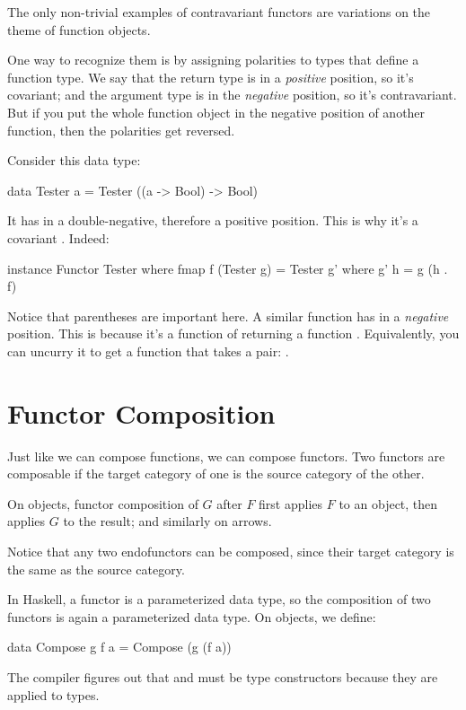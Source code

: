 \documentclass[DaoFP]{subfiles}
\begin{document}
The only non-trivial examples of contravariant functors are variations on the theme of function objects. 

One way to recognize them is by assigning polarities to types that define a function type. We say that the return type is in a \emph{positive} position, so it's covariant; and the argument type is in the \emph{negative} position, so it's contravariant. But if you put the whole function object in the negative position of another function, then the polarities get reversed. 

Consider this data type:
\begin{haskell}
data Tester a = Tester ((a -> Bool) -> Bool)
\end{haskell}
It has  in a double-negative, therefore a positive position. This is why it's a covariant . Indeed:

\begin{haskell}
instance Functor Tester where
  fmap f (Tester g) = Tester g'
    where g' h = g (h . f)
\end{haskell}

Notice that parentheses are important here. A similar function  has  in a \emph{negative} position. This is because it's a function of  returning a function . Equivalently, you can uncurry it to get a function that takes a pair: .

\section{Functor Composition}

Just like we can compose functions, we can compose functors. Two functors are composable if the target category of one is the source category of the other.

 On objects, functor composition of $G$ after $F$ first applies $F$ to an object, then applies $G$ to the result; and similarly on arrows.
 
 Notice that any two endofunctors can be composed, since their target category is the same as the source category.
 
 In Haskell, a functor is a parameterized data type, so the composition of two functors is again a parameterized data type. On objects, we define:
 \begin{haskell}
data Compose g f a = Compose (g (f a))
\end{haskell}
The compiler figures out that  and  must be type constructors because they are applied to types. 
\end{document}

